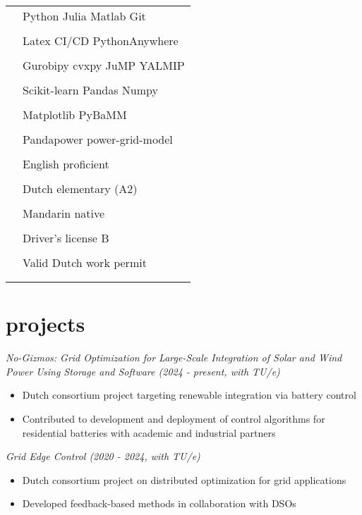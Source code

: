 \documentclass[12pt]{article}
\newcommand{\tableentry}[3]{\textsc{#1} & #2\expandafter\ifstrequal\expandafter{#3}{}{\\}{\\[6pt]}}
\begin{document}
\begin{paracol}{2}
\begin{supertabular}{rl}
  \tableentry{\footnotesize\faCode}{Python \textperiodcentered{} Julia \textperiodcentered{} Matlab
  \textperiodcentered{} Git}{}
  \tableentry{}{Latex \textperiodcentered{} CI/CD \textperiodcentered{} PythonAnywhere}{}

  \tableentry{\footnotesize\faBook}
  { Gurobipy \textperiodcentered{} cvxpy\textperiodcentered{} JuMP \textperiodcentered{} YALMIP }{}
 \tableentry{}{ Scikit-learn \textperiodcentered{} Pandas \textperiodcentered{}  Numpy}{} 
 \tableentry{}{Matplotlib \textperiodcentered{} PyBaMM } {}
   \tableentry{}{ Pandapower \textperiodcentered{} power-grid-model }{} 
  



  \tableentry{\footnotesize\faLanguage}{English \textperiodcentered{} proficient}{}
  \tableentry{}{Dutch \textperiodcentered{} elementary (A2)}{}
    \tableentry{}{Mandarin \textperiodcentered{} native}{}

\tableentry{\footnotesize\faCar}{Driver's license B }{}

\tableentry{\footnotesize\faFile}{Valid Dutch work permit }{}

\end{supertabular}


\section{projects}
\raggedright\textit{No-Gizmos: Grid Optimization for Large-Scale Integration of Solar and Wind Power Using Storage and Software (2024 - present, with TU/e)}
\begin{itemize}[noitemsep,leftmargin=3.5mm,rightmargin=0mm,topsep=6pt]
 \item Dutch consortium project targeting renewable integration via battery control
 \item Contributed to development and deployment of control algorithms for residential batteries with academic and industrial partners
\end{itemize}

\raggedright\textit{Grid Edge Control (2020 - 2024, with TU/e)}
\begin{itemize}[noitemsep,leftmargin=3.5mm,rightmargin=0mm,topsep=6pt]
\item Dutch consortium project on distributed optimization for grid applications
\item Developed feedback-based methods in collaboration with DSOs
\end{itemize}


\newpage

\end{paracol}
\end{document}
